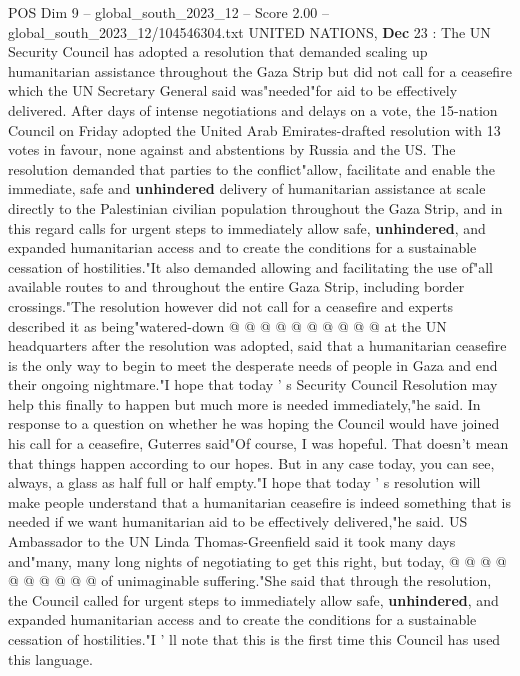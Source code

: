 \begin{textsample}{POS Dim 9 – global\_south\_2023\_12 – Score 2.00 – global\_south\_2023\_12/104546304.txt}  \label{ex:f9_pos_020}
UNITED NATIONS, \textbf{Dec} 23 : The UN Security Council has adopted a resolution that demanded scaling up humanitarian assistance throughout the Gaza Strip but did not call for a ceasefire which the UN Secretary General said was"needed"for aid to be effectively delivered.
After days of intense negotiations and delays on a vote, the 15-nation Council on Friday adopted the United Arab Emirates-drafted resolution with 13 votes in favour, none against and abstentions by Russia and the US.
The resolution demanded that parties to the conflict"allow, facilitate and enable the immediate, safe and \textbf{unhindered} delivery of humanitarian assistance at scale directly to the Palestinian civilian population throughout the Gaza Strip, and in this regard calls for urgent steps to immediately allow safe, \textbf{unhindered}, and expanded humanitarian access and to create the conditions for a sustainable cessation of hostilities."It also demanded allowing and facilitating the use of"all available routes to and throughout the entire Gaza Strip, including border crossings."The resolution however did not call for a ceasefire and experts described it as being"watered-down @ @ @ @ @ @ @ @ @ @ at the UN headquarters after the resolution was adopted, said that a humanitarian ceasefire is the only way to begin to meet the desperate needs of people in Gaza and end their ongoing nightmare."I hope that today ' s Security Council Resolution may help this finally to happen but much more is needed immediately,"he said.
In response to a question on whether he was hoping the Council would have joined his call for a ceasefire, Guterres said"Of course, I was hopeful.
That doesn't mean that things happen according to our hopes.
But in any case today, you can see, always, a glass as half full or half empty."I hope that today ' s resolution will make people understand that a humanitarian ceasefire is indeed something that is needed if we want humanitarian aid to be effectively delivered,"he said.
US Ambassador to the UN Linda Thomas-Greenfield said it took many days and"many, many long nights of negotiating to get this right, but today, @ @ @ @ @ @ @ @ @ @ of unimaginable suffering."She said that through the resolution, the Council called for urgent steps to immediately allow safe, \textbf{unhindered}, and expanded humanitarian access and to create the conditions for a sustainable cessation of hostilities."I ' ll note that this is the first time this Council has used this language.

\end{textsample}
